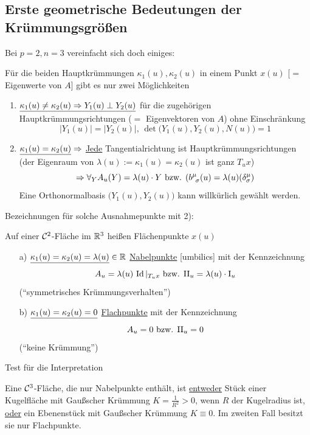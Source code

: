 \subsection{Erste geometrische Bedeutungen der Krümmungsgrößen}
Bei \(p = 2, n = 3\) vereinfacht sich doch einiges: \par
Für die beiden Hauptkrümmungen \(\kappa_1(u), \kappa_2(u)\) in einem Punkt \(x(u)\) [\(=\) Eigenwerte von \(A\)] gibt es nur zwei Möglichkeiten
\begin{enumerate}
 \item \(\uline{\kappa_1(u) \ne \kappa_2(u) \Rightarrow Y_1(u) \perp Y_2(u)}\) für die zugehörigen Hauptkrümmungsrichtungen (\(=\) Eigenvektoren von \(A\)) ohne Einschränkung
 \[
  |Y_1(u)| = |Y_2(u)|, \, \det \big(Y_1(u), Y_2(u), N(u)\big) = 1
 \]
 \item \(\uline{\kappa_1(u) = \kappa_2(u)} \Rightarrow\) \uline{Jede} Tangentialrichtung ist Hauptkrümmungsrichtungen (der Eigenraum  von \(\lambda(u) := \kappa_1(u) = \kappa_2(u)\) ist ganz \(T_u x\))
 \[
  \Rightarrow \forall_Y A_u(Y) = \lambda(u) \cdot Y \text{ bzw. } (b^{\mu}_{\;\, \sigma} (u) = \lambda(u) (\delta^\mu_\sigma)
 \]
 Eine Orthonormalbasis \(\big(Y_1(u), Y_2(u)\big)\) kann willkürlich gewählt werden. \par
 \par
\end{enumerate}
 Bezeichnungen für solche Ausnahmepunkte mit 2):
 \begin{definition}
  Auf einer \(\mathcal{C}^2\)-Fläche im \(\mathbb{R}^3\) heißen Flächenpunkte \(x(u)\) 
  \begin{enumerate}
   \item[a)] \(\uline{\kappa_1(u) = \kappa_2(u) = \lambda (u)} \in \IR\) \uline{Nabelpunkte} [umbilics] mit der Kennzeichnung
   \[
    A_u = \lambda(u) \, \Id|_{T_u x} \text{ bzw. } \Rom 2_u = \lambda(u) \cdot \Rom 1_u
   \]
   ("`symmetrisches Krümmungsverhalten"')
   \item[b)] \(\uline{\kappa_1(u) = \kappa_2(u) = 0}\) \uline{Flachpunkte} mit der Kennzeichnung
   \[
    A_u = 0 \text{ bzw. } \Rom 2_u = 0
   \]
   ("`keine Krümmung"')
  \end{enumerate}
 \end{definition}

Test für die Interpretation

\begin{satz}\label{satz231}
 Eine \(\mathcal{C}^3\)-Fläche, die nur Nabelpunkte enthält, ist \uline{entweder} Stück einer Kugelfläche mit Gaußscher Krümmung \(K = \frac1{R^2} >0\), wenn \(R\) der Kugelradius ist, \uline{oder} ein Ebenenstück mit Gaußscher Krümmung \(K \equiv 0\). Im zweiten Fall besitzt sie nur Flachpunkte.
\end{satz}

